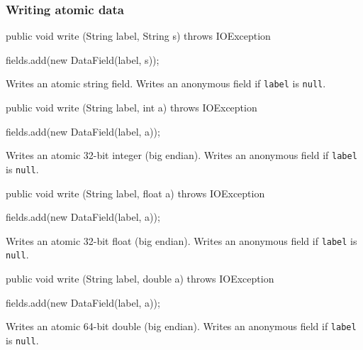       
\subsubsection*{Writing atomic data}

\begin{code}

   public void write (String label, String s) throws IOException \begin{hide} {
      fields.add(new DataField(label, s));
   }
   \end{hide}
\end{code}
\begin{tabb}
Writes an atomic string field.
Writes an anonymous field if \texttt{label} is \texttt{null}.
\end{tabb}
\begin{code}

   public void write (String label, int a) throws IOException \begin{hide} {
      fields.add(new DataField(label, a));
   }
   \end{hide}
\end{code}
\begin{tabb}
Writes an atomic 32-bit integer (big endian).
Writes an anonymous field if \texttt{label} is \texttt{null}.
\end{tabb}
\begin{code}

   public void write (String label, float a) throws IOException \begin{hide} {
      fields.add(new DataField(label, a));
   }
   \end{hide}
\end{code}
\begin{tabb}
Writes an atomic 32-bit float (big endian).
Writes an anonymous field if \texttt{label} is \texttt{null}.
\end{tabb}
\begin{code}

   public void write (String label, double a) throws IOException \begin{hide} {
      fields.add(new DataField(label, a));
   }
   \end{hide}
\end{code}
\begin{tabb}
Writes an atomic 64-bit double (big endian).
Writes an anonymous field if \texttt{label} is \texttt{null}.
\end{tabb}


